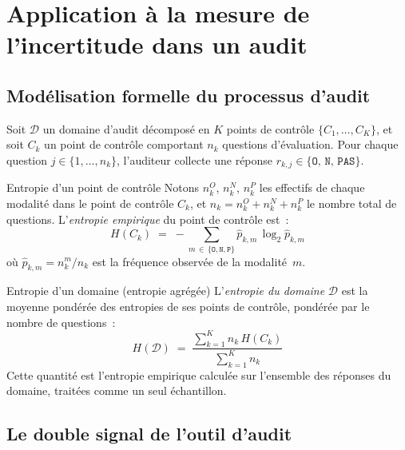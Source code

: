 \section{Application à la mesure de l'incertitude dans un audit}
\label{sec:application-audit}

\subsection{Modélisation formelle du processus d'audit}

Soit $\mathcal{D}$ un domaine d'audit décomposé en $K$ points de contrôle
$\{C_1, \ldots, C_K\}$, et soit $C_k$ un point de contrôle comportant $n_k$
questions d'évaluation. Pour chaque question $j \in \{1, \ldots, n_k\}$, l'auditeur
collecte une réponse $r_{k,j} \in \{\texttt{O},\,\texttt{N},\,\texttt{PAS}\}$.

\begin{boxdef}{Entropie d'un point de contrôle}
Notons $n_k^O$, $n_k^N$, $n_k^P$ les effectifs de chaque modalité dans le point
de contrôle $C_k$, et $n_k = n_k^O + n_k^N + n_k^P$ le nombre total de questions.
L'\emph{entropie empirique} du point de contrôle est~:
\begin{equation}
  H(C_k) \;=\; -\!\!\!\sum_{m \,\in\, \{\texttt{O},\texttt{N},\texttt{P}\}}
  \hat{p}_{k,m}\,\log_2 \hat{p}_{k,m}
  \label{eq:entropie-cp}
\end{equation}
où $\hat{p}_{k,m} = n_k^m / n_k$ est la fréquence observée de la modalité~$m$.
\end{boxdef}

\begin{boxdef}{Entropie d'un domaine (entropie agrégée)}
L'\emph{entropie du domaine} $\mathcal{D}$ est la moyenne pondérée des entropies
de ses points de contrôle, pondérée par le nombre de questions~:
\begin{equation}
  H(\mathcal{D}) \;=\; \frac{\displaystyle\sum_{k=1}^{K} n_k\,H(C_k)}{\displaystyle\sum_{k=1}^{K} n_k}
  \label{eq:entropie-domaine}
\end{equation}
Cette quantité est l'entropie empirique calculée sur l'ensemble des réponses du
domaine, traitées comme un seul échantillon.
\end{boxdef}

\subsection{Le double signal de l'outil d'audit}

